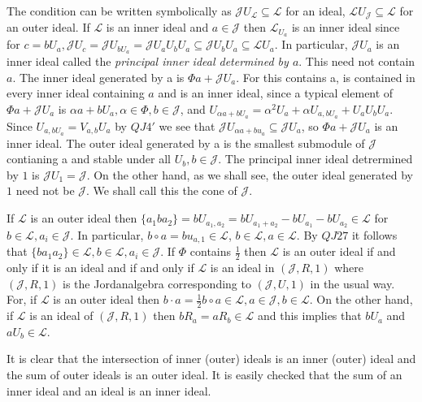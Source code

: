 The condition can be written symbolically as
$\mathscr{J}U_{\mathscr{L}}\subseteq \mathscr{L}$ for an ideal,
$\mathscr{L}U_{\mathscr{J}}\subseteq \mathscr{L}$ for an outer ideal. If
$\mathscr{L}$ is an inner ideal and $a\in\mathscr{J}$ then
$\mathscr{L}_{U_{a}}$ is an inner ideal since for $c=bU_a,
\mathscr{J}U_c=\mathscr{J}U_{bU_{a}}=\mathscr{J} U_aU_bU_a\subseteq
\mathscr{J}U_bU_a\subseteq \mathscr{L} U_a$. In particular,
$\mathscr{J}U_a$ is an inner ideal called the {\em principal inner
  ideal determined by $a$}. This need not contain $a$. The inner ideal
generated by a is $\Phi a +\mathscr{J}U_a$. For this contains a, is
contained in every inner ideal containing $a$ and is an inner ideal,
since a typical element of $\Phi a+\mathscr{J} U_a$ is $\alpha a+b
U_a, \alpha \in \Phi,b\in \mathscr{J}$, and $U_{\alpha
  a+bU_a}=\alpha^{2}U_a+\alpha U_{a,bU_a}+U_aU_bU_a$. Since
$U_{a,bU_{a}}=V_{a,b}U_a$ by $QJ4'$ we see that $\mathscr{J}U_{\alpha
  a+bu_{a}}\subseteq \mathscr{J} U_a$, so $\Phi
a+\mathscr{J}U_a$ is an inner ideal. The outer ideal generated by a is
the smallest submodule of $\mathscr{J}$ contianing a and stable under
all $U_b,b\in \mathscr{J}$. The principal inner ideal detrermined by
$1$ is $\mathscr{J}U_1=\mathscr{J}$. On the other hand, as we shall
see, the outer ideal generated by $1$  need not be $\mathscr{J}$. We
shall call this the {\rm cone} of $\mathscr{J}$. 

If $\mathscr{L}$ is an outer ideal then
$\{a_1ba_2\}=bU_{a_{1},a_{2}}= bU_{a_1+a_2}-bU_{a_1}-bU_{a_2}\in
\mathscr{L}$ for $b\in \mathscr{L}, a_i\in \mathscr{J}$. In
particular, $b\circ a=bu_{a,1}\in \mathscr{L}$, $b\in \mathscr{L},
a\in \mathscr{L}$. By $QJ27$ it follows that $\{ba_1a_2\}\in
\mathscr{L},b\in \mathscr{L}, a_i\in \mathscr{J}$. If $\Phi$ contains
$\frac{1}{2}$ then $\mathscr{L}$ is an outer ideal if and only if it
is an ideal and if and only if $\mathscr{L}$ is an ideal in
$(\mathscr{J},R,1)$ where $(\mathscr{J},R,1)$ is the
Jordan\pageoriginale algebra corresponding to $(\mathscr{J},U,1)$ in
the usual way. For, if $\mathscr{L}$ is an outer ideal then $b\cdot
a=\frac{1}{2} b\circ a\in \mathscr{L}, a\in \mathscr{J}, b\in
\mathscr{L}$. On the other hand, if $\mathscr{L}$ is an ideal of
$(\mathscr{J},R,1)$ then $bR_a=aR_b\in \mathscr{L}$ and this implies
that $bU_a$ and $aU_b\in \mathscr{L}$. 

It is clear that the intersection of inner (outer) ideals is an inner
(outer) ideal and the sum of outer ideals is an outer ideal. It is
easily checked that the sum of an inner ideal and an ideal is an inner
ideal. 

